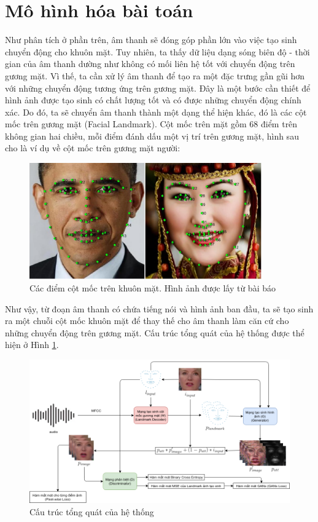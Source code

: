 \section{Mô hình hóa bài toán}\label{sec:modeling}

Như phân tích ở phần trên, âm thanh sẽ đóng góp phần lớn vào việc tạo sinh chuyển động cho khuôn mặt. Tuy nhiên, ta thấy dữ liệu dạng sóng biên độ - thời gian của âm thanh dường như không có mối liên hệ tốt với chuyển động trên gương mặt. Vì thế, ta cần xử lý âm thanh để tạo ra một đặc trưng gần gũi hơn với những chuyển động tương ứng trên gương mặt. Đây là một bước cần thiết để hình ảnh được tạo sinh có chất lượng tốt và có được những chuyển động chính xác. Do đó, ta sẽ chuyển âm thanh thành một dạng thể hiện khác, đó là các cột mốc trên gương mặt (Facial Landmark). Cột mốc trên mặt gồm 68 điểm trên không gian hai chiều, mỗi điểm đánh dấu một vị trí trên gương mặt, hình sau cho là ví dụ về cột mốc trên gương mặt người:

\begin{figure}[H]
    \centering
    \includegraphics[width=10cm]{./content/materials/landmark_intro.png}
    \caption{Các điểm cột mốc trên khuôn mặt. Hình ảnh được lấy từ bài báo \cite{landmark}}
\end{figure}

Như vậy, từ đoạn âm thanh có chứa tiếng nói và hình ảnh ban đầu, ta sẽ tạo sinh ra một chuỗi cột mốc khuôn mặt để thay thế cho âm thanh làm căn cứ cho những chuyển động trên gương mặt. Cấu trúc tổng quát của hệ thống được thể hiện ở Hình \ref{fig:common_architecture}.

\begin{figure}[H]
    \centering
    \includegraphics[width=15cm]{./content/materials/common_architecture.png}
    \caption{Cấu trúc tổng quát của hệ thống}
    \label{fig:common_architecture}
\end{figure}

